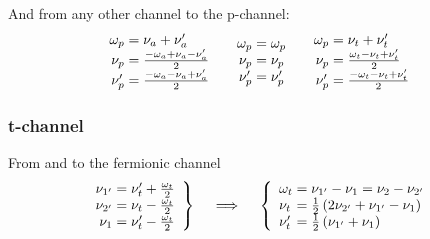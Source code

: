 \documentclass[12pt,a4paper,roman]{article}
\begin{document}
And from any other channel to the p-channel:
\begin{align}
    \begin{array}{r@{\mskip\thickmuskip}l}
    \omega_p &= \nu_a+\nu'_a\\
    \nu_p  &= \frac{-\omega_a+\nu_a-\nu'_a}{2}\\
    \nu'_p &= \frac{-\omega_a-\nu_a+\nu'_a}{2}\\
  \end{array}
  \quad  \begin{array}{r@{\mskip\thickmuskip}l}
    \omega_p &= \omega_p\\
    \nu_p  &= \nu_p \\
    \nu'_p &= \nu'_p\\
  \end{array} \quad
  \begin{array}{r@{\mskip\thickmuskip}l}
    \omega_p &= \nu_t+\nu'_t\\
    \nu_p &= \frac{ \omega_t-\nu_t+\nu'_t}{2}\\
    \nu'_p &= \frac{-\omega_t-\nu_t+\nu'_t}{2}\\
  \end{array}
  \label{eq:PtoAll}
\end{align}

\subsubsection*{t-channel}
From and to the fermionic channel
\begin{align}
    \left.\begin{array}{r@{\mskip\thickmuskip}l}
    \nu_{1'} &= \nu'_t + \frac{\omega_t}{2} \\
    \nu_{2'} &= \nu_t  - \frac{\omega_t}{2} \\
    \nu_{1 } &= \nu'_t - \frac{\omega_t}{2} \\
  \end{array} \right\}
  \quad \implies \quad
  \left\{\begin{array}{l@{\mskip\thickmuskip}l}
    \omega_t &= \nu_{1'} - \nu_{1} = \nu_{2} - \nu_{2'}\\
    \nu_t    &= \frac{1}{2}\left(2\nu_{2'}+\nu_{1'}-\nu_{1}\right) \\
    \nu'_t   &= \frac{1}{2}\left(\nu_{1'} +\nu_{1}\right)\\
  \end{array}\right.
  \label{eq:TtoF}
\end{align}
\end{document}
